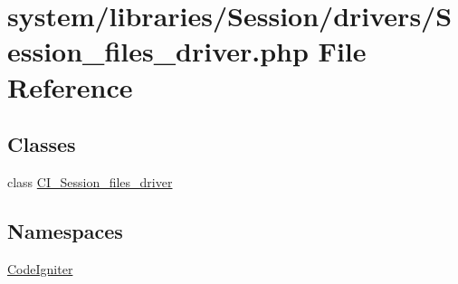 \hypertarget{_session__files__driver_8php}{}\section{system/libraries/\+Session/drivers/\+Session\+\_\+files\+\_\+driver.php File Reference}
\label{_session__files__driver_8php}
\subsection*{Classes}
\begin{DoxyCompactItemize}
\item 
class \mbox{\hyperlink{class_c_i___session__files__driver}{C\+I\+\_\+\+Session\+\_\+files\+\_\+driver}}
\end{DoxyCompactItemize}
\subsection*{Namespaces}
\begin{DoxyCompactItemize}
\item 
 \mbox{\hyperlink{namespace_code_igniter}{Code\+Igniter}}
\end{DoxyCompactItemize}

